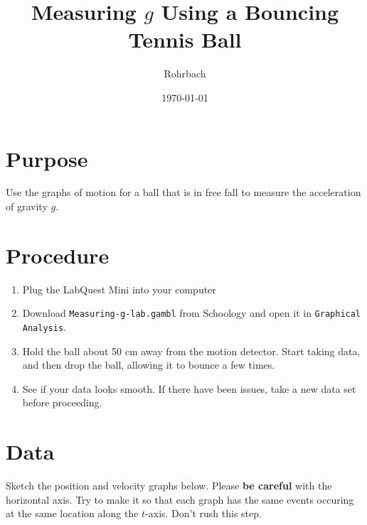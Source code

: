 \documentclass[10pt]{exam}
\title{Measuring $g$ Using a Bouncing Tennis Ball}
\author{Rohrbach}
\date{\today}
\begin{document}
\maketitle

\section*{Purpose}

Use the graphs of motion for a ball that is in free fall to measure the acceleration of gravity $g$.


\section*{Procedure}

\begin{enumerate}
  \item Plug the LabQuest Mini into your computer
  \item Download \texttt{Measuring-g-lab.gambl} from Schoology and open it in \texttt{Graphical Analysis}.
  \item Hold the ball about 50 cm away from the motion detector.  Start taking data, and then drop the ball, allowing it to bounce a few times.
  \item See if your data looks smooth.  If there have been issues, take a new data set before proceeding.
\end{enumerate}

\section*{Data}

Sketch the position and velocity graphs below.  Please \textbf{be careful} with the horizontal axis.  Try to make it so that each graph has the same events occuring at the same location along the $t$-axis.  Don't rush this step.

\hfill 

\end{document}
